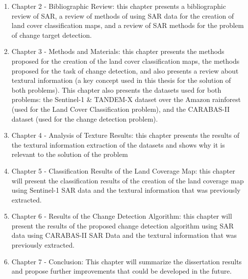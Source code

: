 \begin{enumerate}
    \item Chapter 2 - Bibliographic Review: this chapter presents a bibliographic review of SAR, a review of methods of using SAR data for the creation
          of land cover classification maps, and a review of SAR methods for the problem of change target detection.
    \item Chapter 3 - Methods and Materials: this chapter presents the methods proposed for the creation of the land cover classification maps, the methods proposed for the
          task of change detection, and also presents a review about textural information (a key concept used in this thesis for the solution of both problems). This chapter also presents
          the datasets used for both problems: the Sentinel-1 \& TANDEM-X dataset over the Amazon rainforest (used for the Land Cover Classification problem), and the CARABAS-II dataset (used for the change detection problem).
    \item Chapter 4 - Analysis of Texture Results: this chapter presents the results of the textural information extraction of the datasets and shows why it is relevant to the solution of the problem
    \item Chapter 5 - Classification Results of the Land Coverage Map: this chapter will present the classification results of the creation of the land coverage map using Sentinel-1 SAR data and the textural information that was previously extracted.
    \item Chapter 6 - Results of the Change Detection Algorithm: this chapter will present the results of the proposed change detection algorithm using SAR data using CARABAS-II SAR Data and the textural information that was previously extracted.
    \item Chapter 7 - Conclusion: This chapter will summarize the dissertation results and propose further improvements that could be developed in the future.
\end{enumerate}

